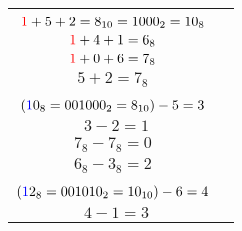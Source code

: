 \documentclass[a4paper,12pt]{article}
\begin{document}
\begin{center}
	\begin{tabular}{cc}
		\begin{minipage}{0.48\linewidth}
			\begin{enumerate}[label=\alph*)]
				\item $6+3 = 9_{10} = 1001_2 = 11_8$ \\ $\textcolor{red}{1}+5+2 = 8_{10} = 1000_2 = 10_8$ \\ $\textcolor{red}{1}+4+1 = 6_8$	
			\end{enumerate}
		\end{minipage}
		&
		\begin{minipage}{0.48\linewidth}
			\begin{enumerate}[start=2,label=\alph*)]
				\item $7+5 = 12_{10} = 1100_2 = 14_8$ \\ $\textcolor{red}{1}+0+6 = 7_8$ \\ $5+2 = 7_8$
			\end{enumerate}
		\end{minipage}
		\\[3em]
		\begin{minipage}{0.48\linewidth}
			\begin{enumerate}[start=3,label=\alph*)]
				\item $(\textcolor{blue}{1}3_8=001011_2=11_{10}) - 6 =5$ \\ $(\textcolor{blue}{1}0_8=001000_2=8_{10})-5 = 3$ \\ $~~3-2 = 1$
			\end{enumerate}
		\end{minipage}
		&
		\begin{minipage}{0.48\linewidth}
			\begin{enumerate}[start=4,label=\alph*)]
				\item $(\textcolor{blue}{1}2_8 = 001010_2 = 10_{10}) - 5 = 5$ \\ $7_8 - 7_8 = 0$ \\ $6_8 - 3_8 = 2$
			\end{enumerate}
		\end{minipage}
		\\[3em]
		\begin{minipage}{0.48\linewidth}
			\begin{enumerate}[start=5,label=\alph*)]
				\item $(\textcolor{blue}{1}0_8=001000:2=8_{10}) -4 = 4$ \\ $(\textcolor{blue}{1}2_8 = 001010_2=10_{10})-6=4$ \\ $~~4-1 =3$

\end{enumerate}
\end{minipage}
\end{tabular}
\end{center}
\end{document}
